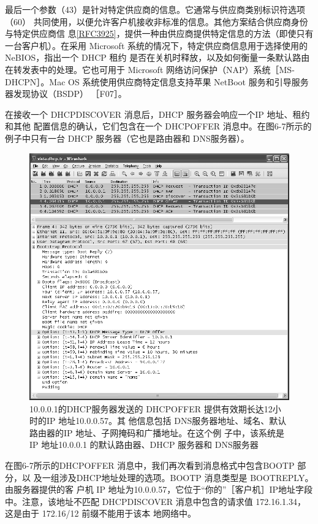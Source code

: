 最后一个参数（43）是针对特定供应商的信息。它通常与供应商类别标识符选项（60）
共同使用，以便允许客户机接收非标准的信息。其他方案结合供应商身份与特定供应商信
息\href{https://www.rfc-editor.org/rfc/rfc3925}{\href{https://www.rfc-editor.org/rfc/rfc3925}{[RFC3925]}}，提供一种由供应商提供特定信息的方法（即使只有一台客户机）。在采用
Microsoft 系统的情况下，特定供应商信息用于选择使用的 NeBIOS，指出一个 DHCP 租约
是否在关机时释放，以及如何衡量一条默认路由在转发表中的处理。它也可用于 Microsoft
网络访问保护（NAP）系统［MS-DHCPN］。Mac OS 系统使用供应商特定信息支持苹果
NetBoot 服务和引导服务器发现协议（BSDP） ［F07］。

在接收一个 DHCPDISCOVER 消息后，DHCP 服务器会响应一个IP 地址、租约和其他
配置信息的确认，它们包含在一个 DHCPOFFER 消息中。在图6-7所示的例子中只有一台
DHCP 服务器（它也是路由器和 DNS服务器）。

\begin{figure}[H]
  \centering
  \includegraphics[scale=0.5]{imgs/6/6-7.png}
  \caption{10.0.0.1的DHCP服务器发送的 DHCPOFFER 提供有效期长达12小时的IP 地址10.0.0.57。其
    他信息包括 DNS服务器地址、域名、默认路由器的IP 地址、子网掩码和广播地址。在这个例
  子中，该系统是 IP 地址10.0.0.1 的默认路由器、DHCP 服务器和 DNS服务器}
\end{figure}

在图6-7所示的DHCPOFFER 消息中，我们再次看到消息格式中包含BOOTP 部分，以
及一组涉及DHCP地址处理的选项。BOOTP 消息类型是 BOOTREPLY。由服务器提供的客
户机 IP 地址为10.0.0.57，它位于“你的”［客户机］IP地址字段中。注意，该地址不匹配
DHCPDISCOVER 消息中包含的请求值 172.16.1.34，这是由于 172.16/12 前缀不能用于该本
地网络中。

